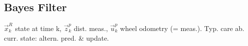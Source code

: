 \subsection{Bayes Filter}
$\vec{x}_k^R$ state at time k, $\vec{z}_k^p$ dist. meas., $\vec{u}^p_k$ wheel odometry (= meas.).
Typ. care ab. curr. state: altern. pred. \& update. 
